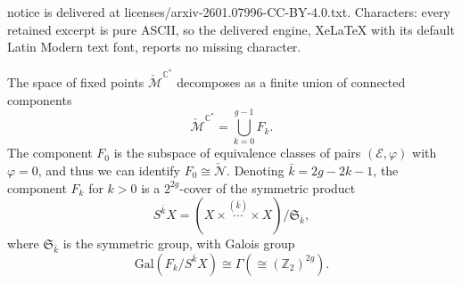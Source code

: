 \documentclass[10pt,a4paper]{amsart}
\newcommand{\C}{\mathbb C}
\newcommand{\Z}{\mathbb Z}
\newcommand{\cM}{\mathcal M}
\newcommand{\cN}{\mathcal N}
\newcommand{\sE}{\mathscr E}
\begin{document}
notice is delivered at licenses/arxiv-2601.07996-CC-BY-4.0.txt. Characters: every retained excerpt is pure ASCII, so the delivered engine, XeLaTeX with its default Latin Modern text font, reports no missing character.
\begin{thm}[Hitchin]
The space of fixed points $\check{\cM}^{\C^*}$ decomposes as a finite union of connected components
\begin{equation*}
\check{\cM}^{\C^*} = \bigcup_{k=0}^{g-1} F_k.
\end{equation*}
The component $F_0$ is the subspace of equivalence classes of pairs $(\sE,\varphi)$ with $\varphi=0$, and thus we can identify $F_0 \cong \check{\cN}$. Denoting $\bar{k}=2g-2k-1$, the component $F_k$ for $k>0$ is a $2^{2g}$-cover of the symmetric product
\begin{equation*}
S^{\bar{k}} X = (X\times \overset{(\bar{k})}{\cdots} \times X)/\mathfrak{S}_{\bar{k}},
\end{equation*}
where $\mathfrak{S}_{\bar{k}}$ is the symmetric group, with Galois group \[\mathrm{Gal}(F_k/S^{\bar{k}}X)\cong \Gamma (\cong (\Z_2)^{2g}).\]
\end{thm}
\end{document}
